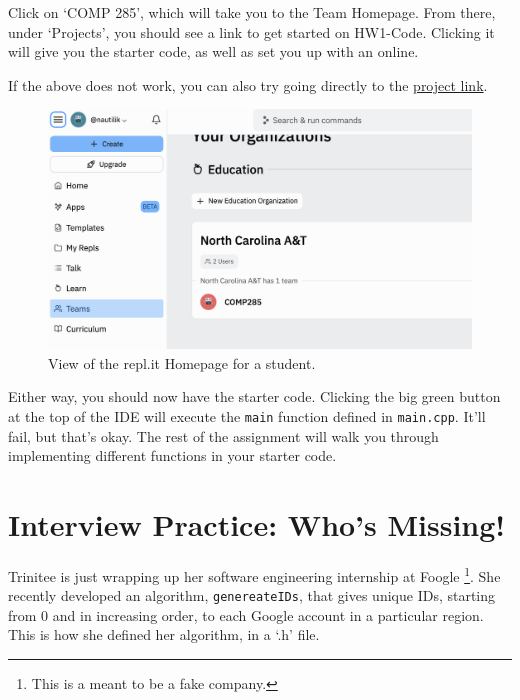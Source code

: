 \documentclass [12pt]{article}
\begin{document}
Click on `COMP 285', which will take you to the Team Homepage. From there, under `Projects', you should see a link to get started on HW1-Code. Clicking it will give you the starter code, as well as set you up with an online. 

If the above does not work, you can also try going directly to the \href{https://replit.com/team/COMP285/HW1-Code}{project link}.

\begin{figure}[h!]
\centering
\includegraphics[scale=0.5]{replit.png}
\caption{View of the repl.it Homepage for a student.}
\label{fig:replit_homepage}
\end{figure}

Either way, you should now have the starter code. Clicking the big green button at the top of the IDE will execute the \texttt{main} function defined in \texttt{main.cpp}. It'll fail, but that's okay. The rest of the assignment will walk you through implementing different functions in your starter code.




\pagebreak
\section{Interview Practice: Who's Missing!}

 Trinitee is just wrapping up her software engineering internship at Foogle \footnote{This is a meant to be a fake company.}. She recently developed an algorithm, \texttt{genereateIDs}, that gives unique IDs, starting from $0$ and in increasing order, to each Google account in a particular region. This is how she defined her algorithm, in a `.h' file.
\end{document}
